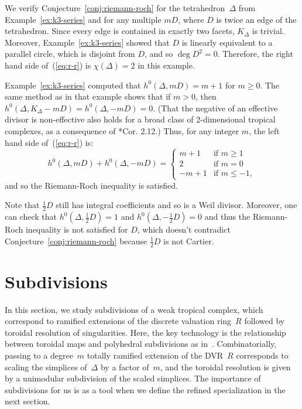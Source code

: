 \documentclass[11pt]{amsart}
\theoremstyle{definition}
\begin{document}
\begin{ex}\label{ex:tetra-rr}
We verify Conjecture~\ref{conj:riemann-roch} for the tetrahedron~$\Delta$
from Example~\ref{ex:k3-series} and for any multiple $mD$,
where $D$ is twice an edge of the tetrahedron. Since every edge is contained in
exactly two facets, $K_\Delta$ is trivial. Moreover, Example~\ref{ex:k3-series}
showed that $D$ is linearly equivalent to a parallel circle, which is disjoint
from $D$, and so $\deg D^2 = 0$.
Therefore, the right hand side of~(\ref{eq:r-r}) is
$\chi(\Delta) = 2$ in this example.

Example~\ref{ex:k3-series} computed that $h^0(\Delta, mD) = m+1$ for $m \geq 0$.
The same method as in that example shows that if $m > 0$, then $h^0(\Delta, K_\Delta
-mD) = h^0(\Delta, -mD) = 0$. (That the negative of an effective
divisor is non-effective also holds for a broad class of 2-dimensional tropical
complexes, as a consequence of \cite{cartwright-surfaces}*{Cor. 2.12}.) Thus,
for any integer $m$, the left hand side of~(\ref{eq:r-r}) is:
\begin{equation*}
h^0(\Delta, mD) + h^0(\Delta, -mD) = \begin{cases}
m + 1 & \mbox{if } m \geq 1 \\
2 & \mbox{if } m = 0 \\
-m + 1 & \mbox{if } m \leq -1,
\end{cases}
\end{equation*}
and so the Riemann-Roch inequality is satisfied.

Note that $\frac{1}{2}D$ still has integral coefficients and so is a
Weil divisor. Moreover, one can check that $h^0(\Delta, \frac{1}{2} D)
= 1$ and $h^0(\Delta, -\frac{1}{2}D) = 0$ and thus the Riemann-Roch inequality
is not satisfied for $D$, which doesn't contradict
Conjecture~\ref{conj:riemann-roch} because $\frac{1}{2} D$ is not Cartier.
\end{ex}

\section{Subdivisions}\label{s:subdivisions}

In this section, we study subdivisions of a weak tropical complex, which
correspond to ramified extensions of the discrete valuation ring~$R$ followed by
toroidal resolution of singularities. Here, the key technology is the
relationship between toroidal maps and polyhedral subdivisions as
in~\cite{kkmsd}. Combinatorially, passing to a degree~$m$ totally ramified
extension of the DVR~$R$ corresponds to scaling the simplices of~$\Delta$ by a
factor of~$m$, and the toroidal resolution is given by a unimodular subdivision
of the scaled simplices. The importance of subdivisions for us is as a tool when
we define the refined specialization in the next section.
\end{document}
